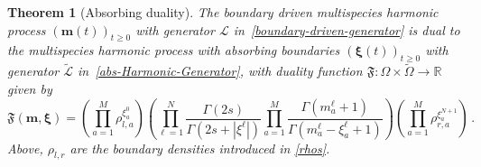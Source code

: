 \documentclass[11pt]{article}
\numberwithin{equation}{section}
\newtheorem{theorem}{Theorem}[section]
\newcommand{\M}{M}
\newcommand{\N}{N}
\begin{document}
\begin{theorem}[Absorbing duality]\label{Thm-duality}
	The boundary driven multispecies harmonic process $(\bm{m}(t))_{t\geq 0}$ with generator $\mathcal{L}$ in~\eqref{boundary-driven-generator} is dual to the multispecies harmonic process with absorbing boundaries $(\bm{\xi}(t))_{t\geq 0}$ with generator $\widetilde{\mathcal{L}}$ in~\eqref{abs-Harmonic-Generator}, with duality function $\mathfrak{F}:\Omega\times \widetilde{\Omega}\to \mathbb{R}$ given by
	\begin{equation}\label{duality-funciton}
		\mathfrak{F}(\bm{m},\bm{\xi})=\left(\prod_{a=1}^{\M}\rho_{l,a}^{\xi_{a}^{0}}\right)\left(\prod_{\ell=1}^{\N}\frac{\Gamma(2s)}{\Gamma(2s+|\xi^{\ell}|)}\prod_{a=1}^{\M}\frac{\Gamma(m_{a}^{\ell}+1)}{\Gamma(m_{a}^{\ell}-\xi_{a}^{\ell}+1)}\right)\left(\prod_{a=1}^{\M}\rho_{r,a}^{\xi_{a}^{N+1}}\right)\,.
	\end{equation}
    Above, $\rho_{l,r}$ are the boundary densities introduced in \eqref{rhos}. 
\end{theorem}
\end{document}
